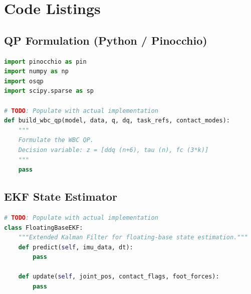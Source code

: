 \chapter{Code Listings}
\label{app:code}


\section{QP Formulation (Python / Pinocchio)}

\begin{lstlisting}[language=Python, caption={QP formulation skeleton using Pinocchio and OSQP.}]
import pinocchio as pin
import numpy as np
import osqp
import scipy.sparse as sp

# TODO: Populate with actual implementation
def build_wbc_qp(model, data, q, dq, task_refs, contact_modes):
    """
    Formulate the WBC QP.
    Decision variable: z = [ddq (n+6), tau (n), fc (3*k)]
    """
    pass
\end{lstlisting}

\section{EKF State Estimator}

\begin{lstlisting}[language=Python, caption={EKF base state estimator skeleton.}]
# TODO: Populate with actual implementation
class FloatingBaseEKF:
    """Extended Kalman Filter for floating-base state estimation."""
    def predict(self, imu_data, dt):
        pass

    def update(self, joint_pos, contact_flags, foot_forces):
        pass
\end{lstlisting}
